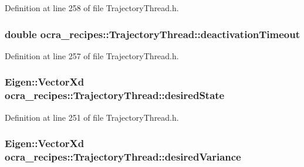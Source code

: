 Definition at line 258 of file Trajectory\+Thread.\+h.

\subsubsection[{\texorpdfstring{deactivation\+Timeout}{deactivationTimeout}}]{\setlength{\rightskip}{0pt plus 5cm}double ocra\+\_\+recipes\+::\+Trajectory\+Thread\+::deactivation\+Timeout\hspace{0.3cm}{\ttfamily [protected]}}\hypertarget{classocra__recipes_1_1TrajectoryThread_ab4de56a2b92a1887e4d046d7fa70d721}{}\label{classocra__recipes_1_1TrajectoryThread_ab4de56a2b92a1887e4d046d7fa70d721}


Definition at line 257 of file Trajectory\+Thread.\+h.

\subsubsection[{\texorpdfstring{desired\+State}{desiredState}}]{\setlength{\rightskip}{0pt plus 5cm}Eigen\+::\+Vector\+Xd ocra\+\_\+recipes\+::\+Trajectory\+Thread\+::desired\+State\hspace{0.3cm}{\ttfamily [protected]}}\hypertarget{classocra__recipes_1_1TrajectoryThread_a2f90808ce72fd5a3a5d0b5d576860564}{}\label{classocra__recipes_1_1TrajectoryThread_a2f90808ce72fd5a3a5d0b5d576860564}


Definition at line 251 of file Trajectory\+Thread.\+h.

\subsubsection[{\texorpdfstring{desired\+Variance}{desiredVariance}}]{\setlength{\rightskip}{0pt plus 5cm}Eigen\+::\+Vector\+Xd ocra\+\_\+recipes\+::\+Trajectory\+Thread\+::desired\+Variance\hspace{0.3cm}{\ttfamily [protected]}}\hypertarget{classocra__recipes_1_1TrajectoryThread_a86a09c83fbbf2b7a22469a3476204b24}{}\label{classocra__recipes_1_1TrajectoryThread_a86a09c83fbbf2b7a22469a3476204b24}


